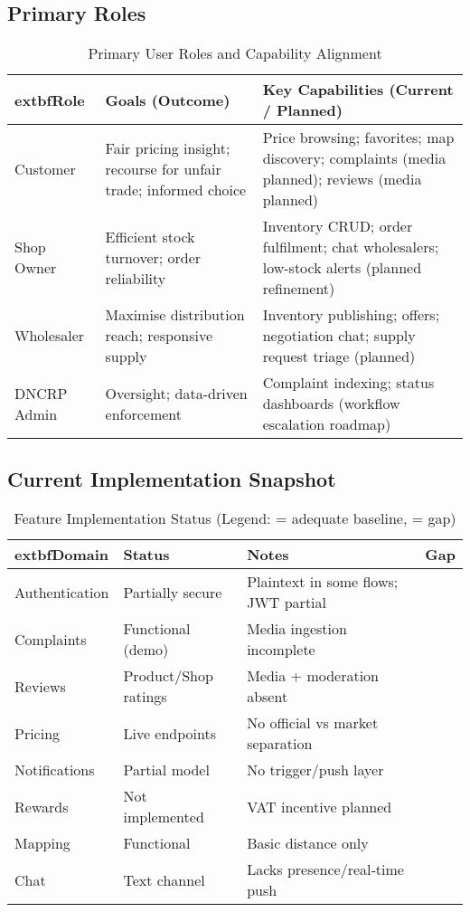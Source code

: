\documentclass[11pt,a4paper]{article}
\newcommand{\tick}{\textcolor{green!60!black}{\ding{51}}}
\newcommand{\cross}{\textcolor{red!70!black}{\ding{55}}}
\begin{document}
\subsection{Primary Roles}
\begin{table}[h]
	\centering
	\renewcommand{\arraystretch}{1.15}
	\caption{Primary User Roles and Capability Alignment}\label{tab:roles}
	\begin{tabular}{|p{2.5cm}|p{4.2cm}|p{7.2cm}|}
		\hline
			extbf{Role} & \textbf{Goals (Outcome)} & \textbf{Key Capabilities (Current / Planned)} \\
		\hline
		Customer & Fair pricing insight; recourse for unfair trade; informed choice & Price browsing; favorites; map discovery; complaints (media planned); reviews (media planned) \\
		\hline
		Shop Owner & Efficient stock turnover; order reliability & Inventory CRUD; order fulfilment; chat wholesalers; low-stock alerts (planned refinement) \\
		\hline
		Wholesaler & Maximise distribution reach; responsive supply & Inventory publishing; offers; negotiation chat; supply request triage (planned) \\
		\hline
		DNCRP Admin & Oversight; data-driven enforcement & Complaint indexing; status dashboards (workflow escalation roadmap) \\
		\hline
	\end{tabular}
\end{table}

\subsection{Current Implementation Snapshot}
\begin{table}[h]
	\centering
	\renewcommand{\arraystretch}{1.15}
	\caption{Feature Implementation Status (Legend: \tick = adequate baseline, \cross = gap)}\label{tab:impl}
	\begin{tabular}{|p{2.8cm}|p{2.7cm}|p{7.0cm}|p{0.9cm}|}
		\hline
			extbf{Domain} & \textbf{Status} & \textbf{Notes} & \textbf{Gap} \\
		\hline
		Authentication & Partially secure & Plaintext in some flows; JWT partial & \cross \\
		\hline
		Complaints & Functional (demo) & Media ingestion incomplete & \cross \\
		\hline
		Reviews & Product/Shop ratings & Media + moderation absent & \cross \\
		\hline
		Pricing & Live endpoints & No official vs market separation & \cross \\
		\hline
		Notifications & Partial model & No trigger/push layer & \cross \\
		\hline
		Rewards & Not implemented & VAT incentive planned & \cross \\
		\hline
		Mapping & Functional & Basic distance only & \tick \\
		\hline
		Chat & Text channel & Lacks presence/real‑time push & \cross \\
		\hline
	\end{tabular}
\end{table}
\end{document}
